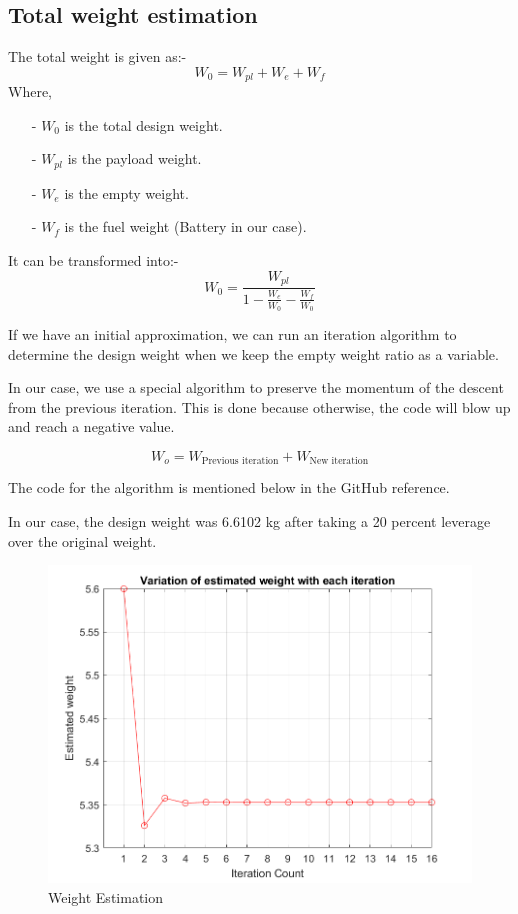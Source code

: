 \documentclass[12 pt]{article}
\begin{document}

\subsection{Total weight estimation}

The total weight is given as:- 
$$ W_0 = W_{pl} + W_{e} + W_{f} $$
Where,
\begin{itemize}
    \item[-] $W_0$ is the total design weight.
    \item [-] $W_{pl}$ is the payload weight.
    \item [-] $W_{e}$ is the empty weight.
    \item [-] $W_{f}$ is the fuel weight (Battery in our case).
\end{itemize}

It can be transformed into:- 
$$W_{0} = \frac{W_{pl}}{1 - \frac{W_{e}}{W_{0}} - \frac{W_{f}}{W_0}}$$

If we have an initial approximation, we can run an iteration algorithm to determine the design weight when we keep the empty weight ratio as a variable.


In our case, we use a special algorithm to preserve the momentum of the descent from the previous iteration. This is done because otherwise, the code will blow up and reach a negative value. 

$$ W_o = W_{\text{Previous iteration}} + W_{\text{New iteration}} $$

The code for the algorithm is mentioned below in the GitHub reference.

In our case, the design weight was 6.6102 kg after taking a 20 percent leverage over the original weight.

\begin{figure}
    \centering
    \includegraphics[width=0.75\linewidth]{Codes/Week 2/weight.png}
    \caption{Weight Estimation}
    \label{Weight Estimation}
\end{figure}
\end{document}

